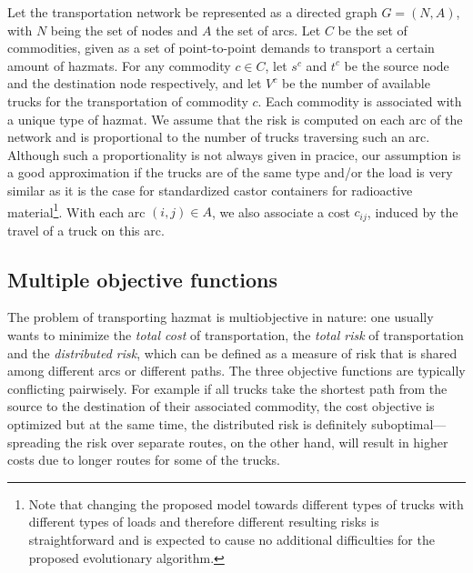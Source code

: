 \documentclass[preprint,12pt]{elsarticle}
\begin{document}
Let the transportation network be represented as a directed graph $G = (N, A)$, with $N$ being the set of nodes and $A$ the set of arcs. Let $C$ be the set of commodities, given as a set of point-to-point demands to transport a certain amount of hazmats. For any commodity $c\in C$, let $s^c$ and $t^c$ be the source node and the destination node respectively, and let $V^c$ be the number of available trucks for the transportation of commodity $c$. Each commodity is associated with a unique type of hazmat. We assume that the risk is computed on each arc of the network and is proportional to the number of trucks traversing such an arc. Although such a proportionality is not always given in pracice, our assumption is a good approximation if the trucks are of the same type and/or the load is very similar as it is the case for standardized castor containers for radioactive material\footnote{Note that changing the proposed model towards different types of trucks with different types of loads and therefore different resulting risks is straightforward and is expected to cause no additional difficulties for the proposed evolutionary algorithm.}. With each arc $(i,j) \in A$, we also associate a cost $c_{ij}$, induced by the travel of a truck on this arc.

\subsection{Multiple objective functions} \label{SS_MOF}
The problem of transporting hazmat is multiobjective in nature: one usually wants to minimize the \textit{total cost} of transportation, the \textit{total risk} of transportation and the {\em distributed risk}, which can be defined as a measure of risk that is shared among different arcs or different paths. The three objective functions are typically conflicting pairwisely. For example if all trucks take the shortest path from the source to the destination of their associated commodity, the cost objective is optimized but at the same time, the distributed risk is definitely suboptimal---spreading the risk over separate routes, on the other hand, will result in higher costs due to longer routes for some of the trucks.
\end{document}
